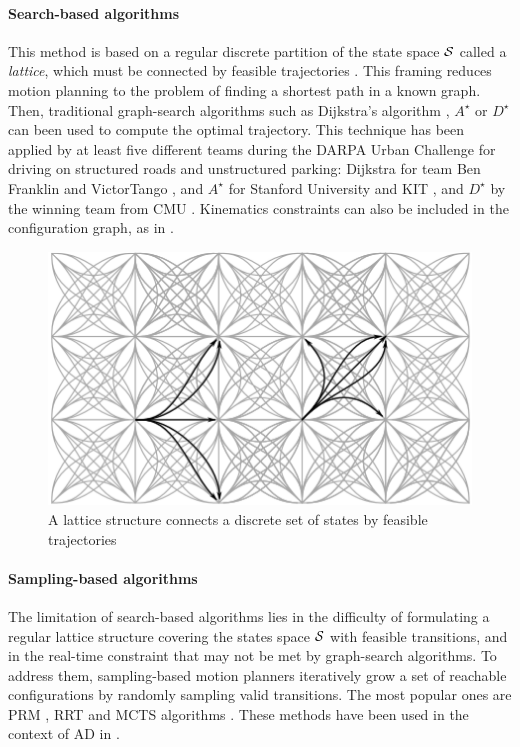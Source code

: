 \paragraph{Search-based algorithms}

This method is based on a regular discrete partition of the state space $\mathcal{S}$ called a \emph{lattice}, which must be connected by feasible trajectories \citep[\eg][]{Pivtoraiko2005}. This framing reduces motion planning to the problem of finding a shortest path in a known graph. Then, traditional graph-search algorithms such as Dijkstra's algorithm \citep{Dijkstra1959}, $A^\star$ \citep{Hart1968} or $D^\star$ \citep{Stentz1994} can been used to compute the optimal trajectory. This technique has been applied by at least five different teams during the DARPA Urban Challenge for driving on structured roads and unstructured parking: Dijkstra for team Ben Franklin \citep{Bohren2008} and VictorTango \citep{Bacha2008}, and $A^\star$ for Stanford University \citep{Montemerlo2008} and KIT \citep{Kammel2008}, and $D^\star$ by the winning team from CMU \citep{Urmson2008}. Kinematics constraints can also be included in the configuration graph, as in \citep[\eg][]{Latombe1991,Fraichard1993,Laumond1994}.

\begin{figure}[tp]
	\centering
	\includegraphics[width=0.5\linewidth]{img/lattice2}
	\caption{A lattice structure connects a discrete set of states by feasible trajectories}
\end{figure}

\paragraph{Sampling-based algorithms}

The limitation of search-based algorithms lies in the difficulty of formulating a regular lattice structure covering the states space $\mathcal{S}$ with feasible transitions, and in the real-time constraint that may not be met by graph-search algorithms. To address them, sampling-based motion planners iteratively grow a set of reachable configurations by randomly sampling valid transitions. The most popular ones are \ac{PRM} \citep{Kavraki1996}, \ac{RRT} \citep{Lavalle98,Karaman2011} and \ac{MCTS} algorithms \citep{Coulom2006, Kocsis2006}. These methods have been used in the context of \acl*{AD} in \citep[\eg][]{Lamiraux2001,Sanchez2002,Lenz2016,Paxton2017,Faust2018}.

